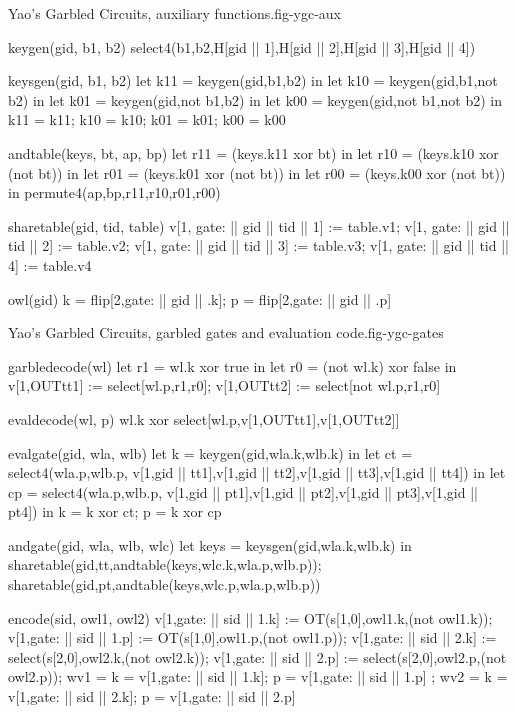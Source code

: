 \begin{fpfig}[t]{Yao's Garbled Circuits, auxiliary functions.}{fig-ygc-aux}
{\footnotesize
\begin{verbatimtab}
  keygen(gid, b1, b2) { select4(b1,b2,H[gid || 1],H[gid || 2],H[gid || 3],H[gid || 4]) }
  
  keysgen(gid, b1, b2)
  {
    let k11 = keygen(gid,b1,b2) in
    let k10 = keygen(gid,b1,not b2) in
    let k01 = keygen(gid,not b1,b2) in
    let k00 = keygen(gid,not b1,not b2) in
    {k11 = k11; k10 = k10; k01 = k01; k00 = k00}
  }
  
  andtable(keys, bt, ap, bp)
  {
    let r11 = (keys.k11 xor bt) in 
    let r10 = (keys.k10 xor (not bt)) in
    let r01 = (keys.k01 xor (not bt)) in
    let r00 = (keys.k00 xor (not bt)) in
    permute4(ap,bp,r11,r10,r01,r00)
  }
  
  sharetable(gid, tid, table)
  {   
    v[1, gate: || gid || tid || 1] := table.v1;
    v[1, gate: || gid || tid || 2] := table.v2;
    v[1, gate: || gid || tid || 3] := table.v3;
    v[1, gate: || gid || tid || 4] := table.v4
  }

  owl(gid) {  { k = flip[2,gate: || gid || .k]; p = flip[2,gate: || gid || .p] }  }
\end{verbatimtab}
}
\end{fpfig}

\begin{fpfig}[t]{Yao's Garbled Circuits, garbled gates and evaluation code.}{fig-ygc-gates}
{\footnotesize
\begin{verbatimtab}
  garbledecode(wl)
  {
    let r1 = wl.k xor true in
    let r0 = (not wl.k) xor false in
    v[1,OUTtt1] := select[wl.p,r1,r0];
    v[1,OUTtt2] := select[not wl.p,r1,r0]
  }
  
  evaldecode(wl, p) { wl.k xor select[wl.p,v[1,OUTtt1],v[1,OUTtt2]] }
  
  evalgate(gid, wla, wlb)
  {
    let k = keygen(gid,wla.k,wlb.k) in
    let ct = select4(wla.p,wlb.p,
               v[1,gid || tt1],v[1,gid || tt2],v[1,gid || tt3],v[1,gid || tt4]) in
    let cp = select4(wla.p,wlb.p,
               v[1,gid || pt1],v[1,gid || pt2],v[1,gid || pt3],v[1,gid || pt4]) in
    { k = k xor ct; p = k xor cp }
  }
  
  andgate(gid, wla, wlb, wlc) 
  {
    let keys = keysgen(gid,wla.k,wlb.k) in
    sharetable(gid,tt,andtable(keys,wlc.k,wla.p,wlb.p));
    sharetable(gid,pt,andtable(keys,wlc.p,wla.p,wlb.p))
  }

  encode(sid, owl1, owl2)
  {
    v[1,gate: || sid || 1.k] := OT(s[1,0],owl1.k,(not owl1.k));
    v[1,gate: || sid || 1.p] := OT(s[1,0],owl1.p,(not owl1.p));
    v[1,gate: || sid || 2.k] := select(s[2,0],owl2.k,(not owl2.k));
    v[1,gate: || sid || 2.p] := select(s[2,0],owl2.p,(not owl2.p));
    { wv1 = { k = v[1,gate: || sid || 1.k]; p = v[1,gate: || sid || 1.p] };
      wv2 = { k = v[1,gate: || sid || 2.k]; p = v[1,gate: || sid || 2.p] } }
  }
\end{verbatimtab}
}
\end{fpfig}


